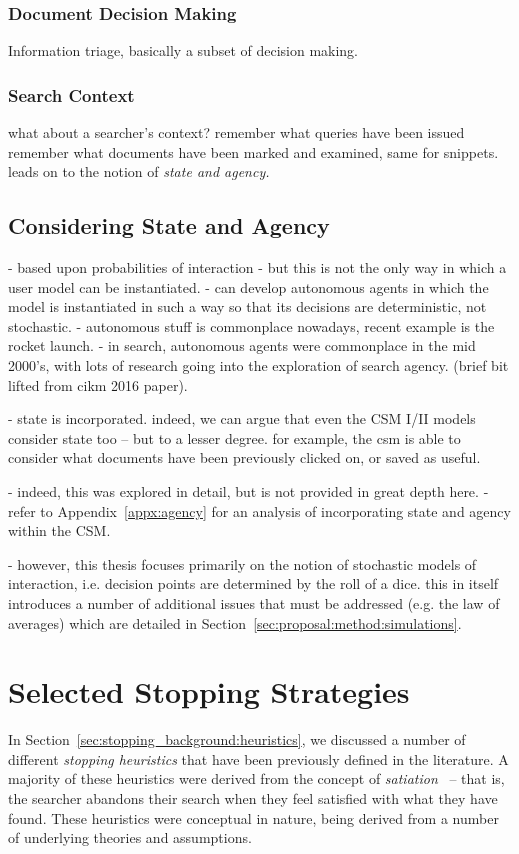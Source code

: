\subsubsection{Document Decision Making}
Information triage, basically a subset of decision making.

\subsubsection{Search Context}
what about a searcher's context?
remember what queries have been issued
remember what documents have been marked and examined, same for snippets.
leads on to the notion of \emph{state and agency.}

\subsection{Considering State and Agency}
- based upon probabilities of interaction
- but this is not the only way in which a user model can be instantiated.
- can develop autonomous agents in which the model is instantiated in such a way so that its decisions are deterministic, not stochastic.
- autonomous stuff is commonplace nowadays, recent example is the rocket launch.
- in search, autonomous agents were commonplace in the mid 2000's, with lots of research going into the exploration of search agency. (brief bit lifted from cikm 2016 paper).

- state is incorporated. indeed, we can argue that even the CSM I/II models consider state too -- but to a lesser degree. for example, the csm is able to consider what documents have been previously clicked on, or saved as useful.

- indeed, this was explored in detail, but is not provided in great depth here.
- refer to Appendix~\ref{appx:agency} for an analysis of incorporating state and agency within the CSM.

- however, this thesis focuses primarily on the notion of stochastic models of interaction, i.e. decision points are determined by the roll of a dice. this in itself introduces a number of additional issues that must be addressed (e.g. the law of averages) which are detailed in Section~\ref{sec:proposal:method:simulations}.

\section{Selected Stopping Strategies}\label{sec:proposal:strategies}
In Section~\ref{sec:stopping_background:heuristics}, we discussed a number of different \emph{stopping heuristics} that have been previously defined in the literature. A majority of these heuristics were derived from the concept of \emph{satiation}~\citep{simon1955satiation} -- that is, the searcher abandons their search when they feel satisfied with what they have found. These heuristics were conceptual in nature, being derived from a number of underlying theories and assumptions.

